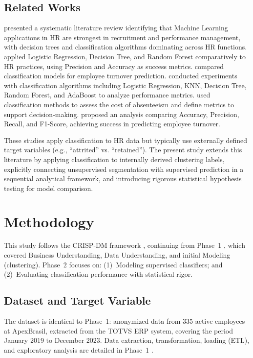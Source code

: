 \documentclass[alpha-refs,english]{RBCA_v3.0}
\begin{document}
\subsection{Related Works}
\cite{Garg2022} presented a systematic literature review identifying that Machine Learning applications in HR are strongest in recruitment and performance management, with decision trees and classification algorithms dominating across HR functions. \cite{Alsaadi2022} applied Logistic Regression, Decision Tree, and Random Forest comparatively to HR practices, using Precision and Accuracy as success metrics. \cite{Liao2023} compared classification models for employee turnover prediction. \cite{Padmaja2022} conducted experiments with classification algorithms including Logistic Regression, KNN, Decision Tree, Random Forest, and AdaBoost to analyze performance metrics. \cite{Lawrance2021} used classification methods to assess the cost of absenteeism and define metrics to support decision-making. \cite{Fallucchi2020} proposed an analysis comparing Accuracy, Precision, Recall, and F1-Score, achieving success in predicting employee turnover.

These studies apply classification to HR data but typically use externally defined target variables (e.g., ``attrited'' vs. ``retained''). The present study extends this literature by applying classification to internally derived clustering labels, explicitly connecting unsupervised segmentation with supervised prediction in a sequential analytical framework, and introducing rigorous statistical hypothesis testing for model comparison.


\section{Methodology}
\label{sec:methodology}

This study follows the CRISP-DM framework \citep{Chapman2000}, continuing from Phase~1 \citep{Moreira2026}, which covered Business Understanding, Data Understanding, and initial Modeling (clustering). Phase~2 focuses on: (1)~Modeling supervised classifiers; and (2)~Evaluating classification performance with statistical rigor.

\subsection{Dataset and Target Variable}
The dataset is identical to Phase~1: anonymized data from 335 active employees at ApexBrasil, extracted from the TOTVS ERP system, covering the period January 2019 to December 2023. Data extraction, transformation, loading (ETL), and exploratory analysis are detailed in Phase~1 \citep{Moreira2026}.
\end{document}
